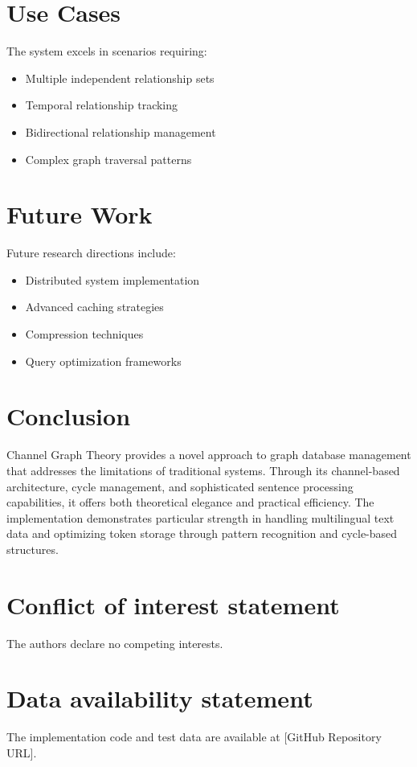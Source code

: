 \section{Use Cases}\label{Sec:UseCases}
The system excels in scenarios requiring:
\begin{itemize}
    \item Multiple independent relationship sets
    \item Temporal relationship tracking
    \item Bidirectional relationship management
    \item Complex graph traversal patterns
\end{itemize}

\section{Future Work}\label{Sec:Future}
Future research directions include:
\begin{itemize}
    \item Distributed system implementation
    \item Advanced caching strategies
    \item Compression techniques
    \item Query optimization frameworks
\end{itemize}

\section{Conclusion}\label{Sec:Conclusion}
Channel Graph Theory provides a novel approach to graph database management that addresses the limitations of traditional systems. Through its channel-based architecture, cycle management, and sophisticated sentence processing capabilities, it offers both theoretical elegance and practical efficiency. The implementation demonstrates particular strength in handling multilingual text data and optimizing token storage through pattern recognition and cycle-based structures.

\section*{Conflict of interest statement}
The authors declare no competing interests.

\section*{Data availability statement}
The implementation code and test data are available at [GitHub Repository URL].



